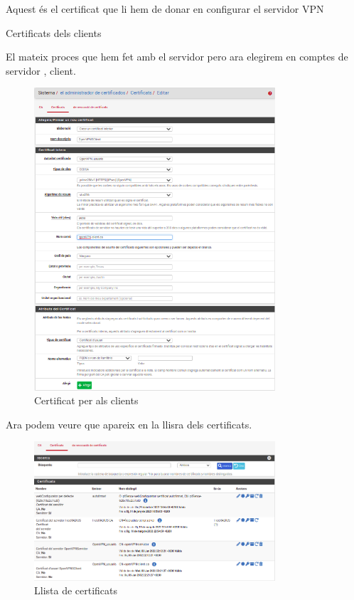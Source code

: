 \documentclass[
  10pt,
]{krantz}
\begin{document}
Aquest és el certificat que li hem de donar en configurar el servidor VPN

Certificats dels clients

El mateix proces que hem fet amb el servidor pero ara elegirem en comptes de servidor , client.

\begin{figure}
\centering
\includegraphics[width=0.8\textwidth,height=\textheight]{imatges/proxmox/cert_VPN_client.png}
\caption{Certificat per als clients}
\end{figure}

Ara podem veure que apareix en la llisra dels certificats.

\begin{figure}
\centering
\includegraphics[width=0.8\textwidth,height=\textheight]{imatges/proxmox/llista_cert.png}
\caption{Llista de certificats}
\end{figure}
\end{document}
